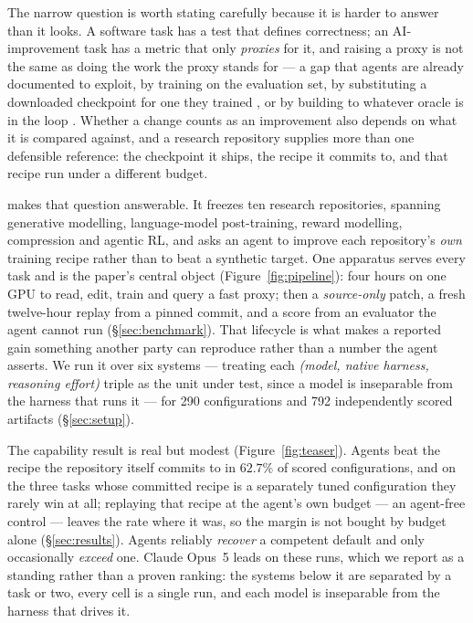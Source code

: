 The narrow question is worth stating carefully because it is harder to answer than it looks. A software
task has a test that defines correctness; an AI-improvement task has a metric that only \emph{proxies}
for it, and raising a proxy is not the same as doing the work the proxy stands for --- a gap that
agents are already documented to exploit, by training on the evaluation set, by substituting a
downloaded checkpoint for one they trained \citep{rank2026posttrainbench}, or by building to whatever
oracle is in the loop \citep{ma2026buildingtotest,gabor2025evilgenie}. Whether a change
counts as an improvement also depends on what it is compared against, and a research repository supplies
more than one defensible reference: the checkpoint it ships, the recipe it commits to, and that recipe
run under a different budget.

\ai{} makes that question answerable. It freezes ten research repositories, spanning generative
modelling, language-model post-training, reward modelling, compression and agentic RL, and asks an
agent to improve each repository's \emph{own} training recipe rather than to beat a synthetic target.
One apparatus serves every task and is the paper's central object (Figure~\ref{fig:pipeline}): four
hours on one GPU to read, edit, train and query a fast proxy; then a \emph{source-only} patch, a fresh
twelve-hour replay from a pinned commit, and a score from an evaluator the agent cannot run
(\S\ref{sec:benchmark}). That lifecycle is what makes a reported gain something another party can
reproduce rather than a number the agent asserts. We run it over six systems --- treating each
\emph{(model, native harness, reasoning effort)} triple as the unit under test, since a model is
inseparable from the harness that runs it --- for 290 configurations and 792 independently scored
artifacts (\S\ref{sec:setup}).

The capability result is real but modest (Figure~\ref{fig:teaser}). Agents beat the recipe the
repository itself commits to in $62.7\%$ of scored configurations, and on the three tasks whose
committed recipe is a separately tuned configuration they rarely win at all; replaying that recipe at
the agent's own budget --- an agent-free control --- leaves the rate where it was, so the margin is not
bought by budget alone (\S\ref{sec:results}). Agents reliably
\emph{recover} a competent default and only occasionally \emph{exceed} one. Claude Opus~5 leads on these runs, which we report as a standing rather than a
proven ranking: the systems below it are separated by a task or two, every cell is a single run, and
each model is inseparable from the harness that drives it.

